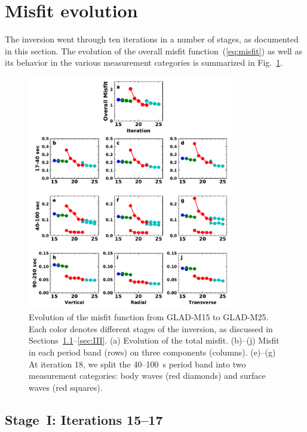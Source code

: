 \documentclass[extra,mreferee]{gji}
\begin{document}
\section{Misfit evolution}
\label{section:misfit_evolution}

The inversion went through ten iterations in a number of stages, as documented
in this section. The evolution of the overall misfit function~(\ref{eq:misfit})
as well as its behavior in the various measurement categories is summarized
in Fig.~\ref{fig:misfit}.

\begin{figure}
  \centering
  \includegraphics[width=0.8\textwidth]{figures/misfit.pdf}
  \caption{Evolution of the misfit function from GLAD-M15 to GLAD-M25.
  Each color denotes different stages of the inversion, as discussed in Sections~\ref{sec:I}--\ref{sec:III}.
  (a) Evolution of the total misfit. (b)--(j) Misfit in
  each period band (rows) on three components (columns). (e)--(g) At iteration 18,
  we  split the 40--100~s period band into two
  measurement categories: body waves (red diamonds) and surface waves
  (red squares).
  }
  \label{fig:misfit}
\end{figure}

\subsection{Stage~I: Iterations 15--17}
\label{sec:I}
\end{document}
